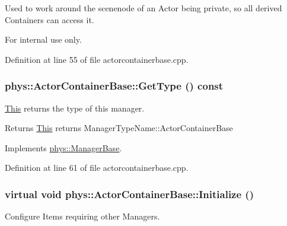 Used to work around the scenenode of an Actor being private, so all derived Containers can access it. 

\begin{DoxyInternal}{For internal use only.}
\end{DoxyInternal}


Definition at line 55 of file actorcontainerbase.cpp.

\hypertarget{classphys_1_1ActorContainerBase_aa86380fd1b18d660f68b60f075967cf8}{
\subsubsection[{GetType}]{ phys::ActorContainerBase::GetType () const}}
\label{d1/d00/classphys_1_1ActorContainerBase_aa86380fd1b18d660f68b60f075967cf8}


\hyperlink{structThis}{This} returns the type of this manager. 

\begin{DoxyReturn}{Returns}
\hyperlink{structThis}{This} returns ManagerTypeName::ActorContainerBase 
\end{DoxyReturn}


Implements \hyperlink{classphys_1_1ManagerBase_aff400b6599db635e24796d8221e9a0e3}{phys::ManagerBase}.



Definition at line 61 of file actorcontainerbase.cpp.

\hypertarget{classphys_1_1ActorContainerBase_af36d5866e0ee9f6f450a4e62642e0928}{
\subsubsection[{Initialize}]{\setlength{\rightskip}{0pt plus 5cm}virtual void phys::ActorContainerBase::Initialize ()}}
\label{d1/d00/classphys_1_1ActorContainerBase_af36d5866e0ee9f6f450a4e62642e0928}


Configure Items requiring other Managers. 

